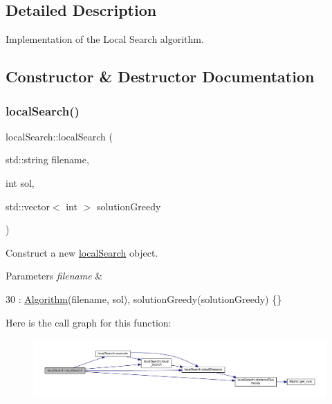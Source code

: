 \subsection{Detailed Description}
Implementation of the Local Search algorithm. 

\subsection{Constructor \& Destructor Documentation}
\mbox{\label{classlocalSearch_a30b47bf0168e1ad75f42868780de1f96}} 
\subsubsection{\texorpdfstring{local\+Search()}{localSearch()}}
{\footnotesize\ttfamily local\+Search\+::local\+Search (\begin{DoxyParamCaption}\item[{std\+::string}]{filename,  }\item[{int}]{sol,  }\item[{std\+::vector$<$ int $>$}]{solution\+Greedy }\end{DoxyParamCaption})\hspace{0.3cm}{\ttfamily [inline]}}



Construct a new \hyperlink{classlocalSearch}{local\+Search} object. 


\begin{DoxyParams}{Parameters}
{\em filename} & \\
\hline
\end{DoxyParams}

\begin{DoxyCode}
30 : \hyperlink{classAlgorithm_a3c199c8528aae86f06ac515d5102fa09}{Algorithm}(filename, sol), solutionGreedy(solutionGreedy) \{\}
\end{DoxyCode}
Here is the call graph for this function\+:
\nopagebreak
\begin{figure}[H]
\begin{center}
\leavevmode
\includegraphics[width=350pt]{classlocalSearch_a30b47bf0168e1ad75f42868780de1f96_cgraph}
\end{center}
\end{figure}


